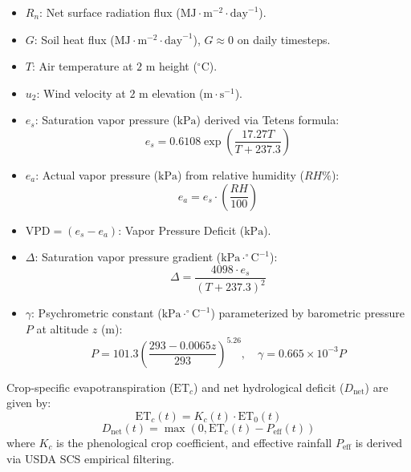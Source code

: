 \documentclass[conference]{IEEEtran}
\begin{document}
\begin{itemize}
    \item $R_n$: Net surface radiation flux ($\text{MJ}\cdot\text{m}^{-2}\cdot\text{day}^{-1}$).
    \item $G$: Soil heat flux ($\text{MJ}\cdot\text{m}^{-2}\cdot\text{day}^{-1}$), $G \approx 0$ on daily timesteps.
    \item $T$: Air temperature at $2\text{ m}$ height ($^\circ\text{C}$).
    \item $u_2$: Wind velocity at $2\text{ m}$ elevation ($\text{m}\cdot\text{s}^{-1}$).
    \item $e_s$: Saturation vapor pressure ($\text{kPa}$) derived via Tetens formula:
    \begin{equation}
    e_s = 0.6108 \exp\left(\frac{17.27 T}{T + 237.3}\right)
    \end{equation}
    \item $e_a$: Actual vapor pressure ($\text{kPa}$) from relative humidity ($RH\%$):
    \begin{equation}
    e_a = e_s \cdot \left(\frac{RH}{100}\right)
    \end{equation}
    \item $\text{VPD} = (e_s - e_a)$: Vapor Pressure Deficit ($\text{kPa}$).
    \item $\Delta$: Saturation vapor pressure gradient ($\text{kPa}\cdot^\circ\text{C}^{-1}$):
    \begin{equation}
    \Delta = \frac{4098 \cdot e_s}{(T + 237.3)^2}
    \end{equation}
    \item $\gamma$: Psychrometric constant ($\text{kPa}\cdot^\circ\text{C}^{-1}$) parameterized by barometric pressure $P$ at altitude $z$ ($\text{m}$):
    \begin{equation}
    P = 101.3 \left(\frac{293 - 0.0065 z}{293}\right)^{5.26}, \quad \gamma = 0.665 \times 10^{-3} P
    \end{equation}
\end{itemize}

Crop-specific evapotranspiration ($\text{ET}_c$) and net hydrological deficit ($D_{\text{net}}$) are given by:
\begin{equation}
\text{ET}_c(t) = K_c(t) \cdot \text{ET}_0(t)
\end{equation}
\begin{equation}
D_{\text{net}}(t) = \max\left(0, \text{ET}_c(t) - P_{\text{eff}}(t)\right)
\end{equation}
where $K_c$ is the phenological crop coefficient, and effective rainfall $P_{\text{eff}}$ is derived via USDA SCS empirical filtering.
\end{document}
